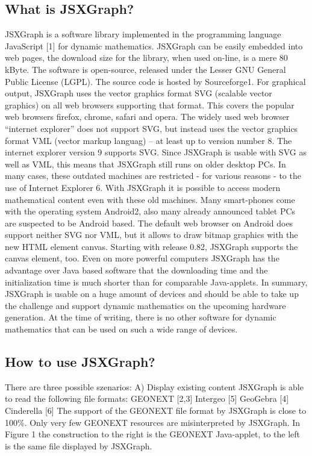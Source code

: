 \documentclass[12pt,a4paper]{article}%
\begin{document}
\subsection{What is JSXGraph?}
JSXGraph is a software library implemented in the programming language JavaScript [1] for dynamic mathematics. JSXGraph can be easily embedded into web pages, the download size for the library, when used on-line, is a mere 80 kByte. The software is open-source, released under the Lesser GNU General Public License (LGPL). The source code is hosted by Sourceforge1. 
For graphical output, JSXGraph uses the vector graphics format SVG (scalable vector graphics) on all web browsers supporting that format. This covers the popular web browsers firefox, chrome, safari and opera. The widely used web browser “internet explorer” does not support SVG, but instead uses the vector graphics format VML (vector markup languag) – at least up to version number 8. The internet explorer version 9 supports SVG. Since JSXGraph is usable with SVG as well as VML, this means that JSXGraph still runs on older desktop PCs. In many cases, these outdated machines are restricted - for various reasons - to the use of  Internet Explorer 6. With  JSXGraph it is possible to access modern mathematical content even with these old machines.
Many smart-phones come with the operating system Android2, also many already announced tablet PCs are suspected to be Android based. The default web browser on Android does support neither SVG nor VML, but it allows to draw bitmap graphics with the new HTML element canvas. Starting with release 0.82, JSXGraph supports the canvas element, too. 
Even on more powerful computers JSXGraph has the advantage over Java based software that the downloading time and the initialization time is much shorter than for comparable Java-applets. 
In summary, JSXGraph is usable on a huge amount of devices and should be able to take up the challenge and support dynamic mathematics on the upcoming hardware generation.
At the time of writing, there is no other software for dynamic mathematics that can be used on such a wide range of devices.

\subsection{How to use JSXGraph?}
There are three possible szenarios:
A) Display existing content
JSXGraph is able to read the following file formats:
GEONEXT [2,3]
Intergeo [5]
GeoGebra [4]
Cinderella [6]
The support of the GEONEXT file format by JSXGraph is close to 100\%. Only very few GEONEXT resources are misinterpreted by JSXGraph. In Figure 1 the construction to the right is the GEONEXT Java-applet, to the left is the same file displayed by JSXGraph.
\end{document}
